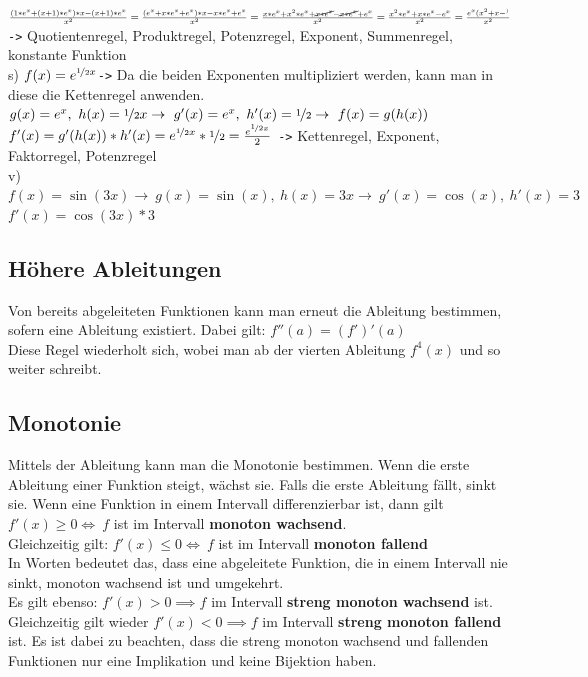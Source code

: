 \documentclass{article}
\begin{document}
	$\frac{(1*e^x+(x+1)*e^x)*x-(x+1)*e^x}{x^2}=\frac{(e^x+x*e^x+e^x)*x-x*e^x+e^x}{x^2}=\frac{x*e^x+x^2*e^x+\cancel{x*e^x}-\cancel{x*e^x}+e^x}{x^2}=\frac{x^2*e^x+x*e^x-e^x}{x^2}=\frac{e^x(x^2+x-^)}{x^2}$ \verb|->| Quotientenregel, Produktregel, Potenzregel, Exponent, Summenregel, konstante Funktion \\
	s) $f(x)=e^{\nicefrac{1}{2}x}$\verb|->| Da die beiden Exponenten multipliziert werden, kann man in diese die Kettenregel anwenden. \\
	$g(x)=e^x,\ h(x)=\nicefrac{1}{2}x\to\ g'(x)=e^x,\ h'(x)=\nicefrac{1}{2}\to\ f(x)=g(h(x))$ \\
	$f'(x)=g'(h(x))*h'(x)=e^{\nicefrac{1}{2}x}*\nicefrac{1}{2}=\frac{e^{\nicefrac{1}{2}x}}{2}$ \verb|->| Kettenregel, Exponent, Faktorregel, Potenzregel \\
	v) $f(x)=\sin(3x)\to\ g(x)=\sin(x),\ h(x)=3x\to\ g'(x)=\cos(x),\ h'(x)=3$ \\
	$f'(x)=\cos(3x)*3$
	\subsection{Höhere Ableitungen}
	Von bereits abgeleiteten Funktionen kann man erneut die Ableitung bestimmen, sofern eine Ableitung existiert. Dabei gilt: $f''(a)=(f')'(a)$ \\
	Diese Regel wiederholt sich, wobei man ab der vierten Ableitung $f^{4}(x)$ und so weiter schreibt. \\
	\subsection{Monotonie}
	Mittels der Ableitung kann man die Monotonie bestimmen. Wenn die erste Ableitung einer Funktion steigt, wächst sie. Falls die erste Ableitung fällt, sinkt sie. Wenn eine Funktion in einem Intervall differenzierbar ist, dann gilt $f'(x)\geq 0\iff\ f$ ist im Intervall \textbf{monoton wachsend}. \\
	Gleichzeitig gilt: $f'(x)\leq 0\iff\ f$ ist im Intervall \textbf{monoton fallend}\\
	In Worten bedeutet das, dass eine abgeleitete Funktion, die in einem Intervall nie sinkt, monoton wachsend ist und umgekehrt. \\
	Es gilt ebenso: $f'(x) > 0\implies f$ im Intervall \textbf{streng monoton wachsend} ist. Gleichzeitig gilt wieder $f'(x) < 0\implies f$ im Intervall \textbf{streng monoton fallend} ist. Es ist dabei zu beachten, dass die streng monoton wachsend und fallenden Funktionen nur eine Implikation und keine Bijektion haben.
\end{document}
